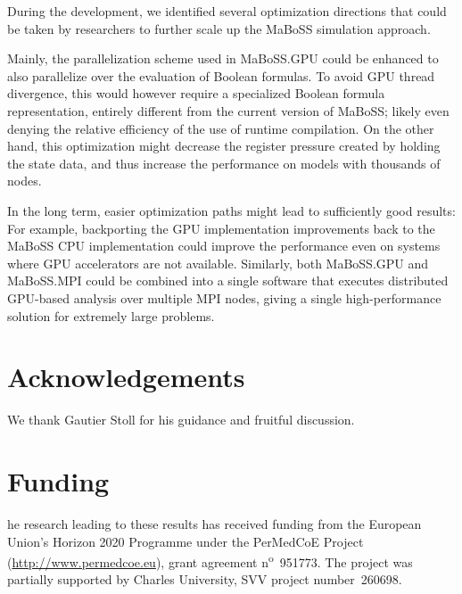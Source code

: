 \documentclass[a4paper,num-refs]{oup-contemporary}
\begin{document}
During the development, we identified several optimization directions that could be taken by researchers to further scale up the MaBoSS simulation approach.

Mainly, the parallelization scheme used in MaBoSS.GPU could be enhanced to also parallelize over the evaluation of Boolean formulas. To avoid GPU thread divergence, this would however require a specialized Boolean formula representation, entirely different from the current version of MaBoSS; likely even denying the relative efficiency of the use of runtime compilation. On the other hand, this optimization might decrease the register pressure created by holding the state data, and thus increase the performance on models with thousands of nodes.

In the long term, easier optimization paths might lead to sufficiently good results: For example, backporting the GPU implementation improvements back to the MaBoSS CPU implementation could improve the performance even on systems where GPU accelerators are not available. Similarly, both MaBoSS.GPU and MaBoSS.MPI could be combined into a single software that executes distributed GPU-based analysis over multiple MPI nodes, giving a single high-performance solution for extremely large problems.

\section{Acknowledgements}
We thank Gautier Stoll for his guidance and fruitful discussion.

\section{Funding}
he research leading to these results has received funding from the European Union's Horizon 2020 Programme under the PerMedCoE Project (\url{http://www.permedcoe.eu}), grant agreement n\textsuperscript{o}~951773.
The project was partially supported by Charles University, SVV project number~260698.






\end{document}
